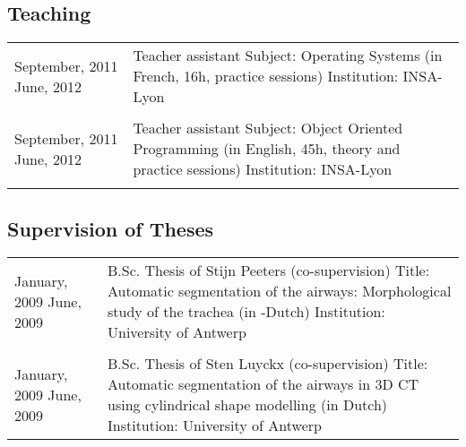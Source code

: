 \subsection{Teaching}
\begin{tabular}{p{} p{}}
September, 2011 \newline June, 2012 & Teacher assistant \newline
Subject: Operating Systems \newline
(in French, 16h, practice sessions) \newline
Institution: INSA-Lyon\\
\\
September, 2011 \newline June, 2012 & Teacher assistant \newline
Subject: Object Oriented Programming \newline
(in English, 45h, theory and practice sessions) \newline
Institution: INSA-Lyon\\
\\
\end{tabular}

\subsection{Supervision of Theses}
\begin{tabular}{p{} p{}}
January, 2009 \newline June, 2009 & B.Sc. Thesis of Stijn Peeters (co-supervision) \newline
Title: Automatic segmentation of the airways: Morphological study of the trachea (in -Dutch) \newline
Institution: University of Antwerp\\
\\
January, 2009 \newline June, 2009 & B.Sc. Thesis of Sten Luyckx (co-supervision) \newline
Title: Automatic segmentation of the airways in 3D CT using cylindrical shape modelling (in Dutch) \newline
Institution: University of Antwerp\\
\end{tabular}


